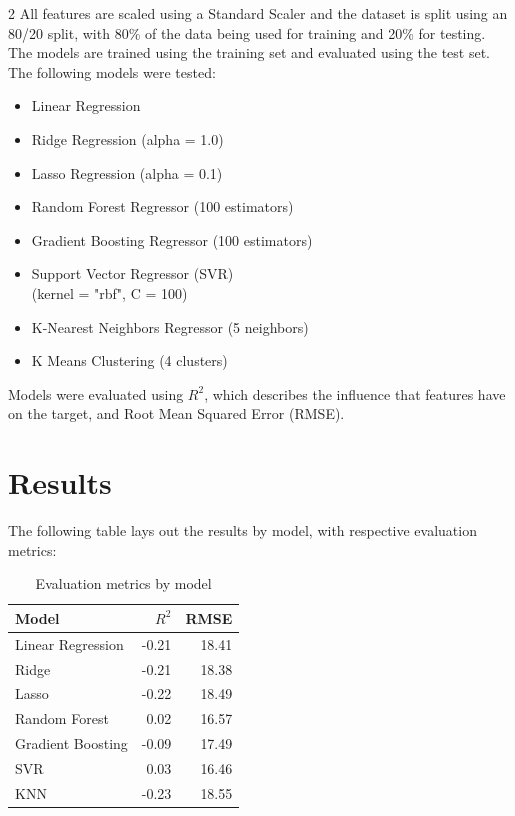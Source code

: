 \documentclass[12pt, a4paper]{article}
\begin{document}
\begin{multicols}{2}
    All features are scaled using a Standard Scaler and the dataset is split using an 80/20 split, with 80\% of the data being used for training and 20\% for testing. The models are trained using the training set and evaluated using the test set.
    The following models were tested:
    \begin{itemize}
        \item Linear Regression
        \item Ridge Regression (alpha = 1.0)
        \item Lasso Regression (alpha = 0.1)
        \item Random Forest Regressor (100 estimators)
        \item Gradient Boosting Regressor (100 estimators)
        \item Support Vector Regressor (SVR) \\ (kernel = "rbf", C = 100)
        \item K-Nearest Neighbors Regressor (5 neighbors)
        \item K Means Clustering (4 clusters)
    \end{itemize}
    Models were evaluated using $R^2$, which describes the influence that features have on the target, and Root Mean Squared Error (RMSE).
    \section{Results}
    The following table lays out the results by model, with respective evaluation metrics:
    \begin{table}[H]
    \caption{Evaluation metrics by model}
    \setlength{\tabcolsep}{4pt} 
    \begin{tabular}{|l|r|r|}
        \hline
        Model & $R^2$ & RMSE \\
        \hline
        Linear Regression & -0.21 & 18.41 \\
        Ridge & -0.21 & 18.38 \\
        Lasso & -0.22 & 18.49 \\
        Random Forest & 0.02 & 16.57 \\
        Gradient Boosting & -0.09 & 17.49 \\
        SVR & 0.03 & 16.46 \\
        KNN & -0.23 & 18.55 \\
        \hline
    \end{tabular}
    \end{table}
    \FloatBarrier
    

\end{multicols}
\end{document}
